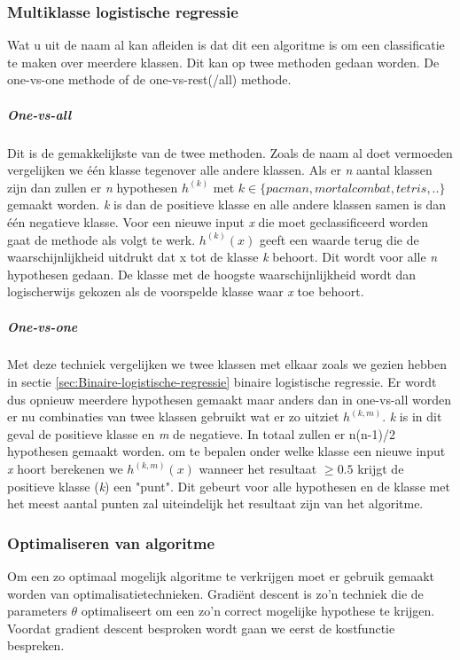 \subsubsection{Multiklasse logistische regressie}
\label{sec:Multiklasse-logistische-regressie}
Wat u uit de naam al kan afleiden is dat dit een algoritme is om een classificatie te maken over meerdere klassen. Dit kan op twee methoden gedaan worden. De one-vs-one methode of de one-vs-rest(/all) methode. 
\subparagraph{One-vs-all}
Dit is de gemakkelijkste van de twee methoden. Zoals de naam al doet vermoeden vergelijken we één klasse tegenover alle andere klassen. Als er \textit{n} aantal klassen zijn dan zullen er \textit{n} hypothesen $h^{(k)}$ met $k \in \{pacman, mortal combat, tetris, ..\}$ gemaakt worden. \textit{k} is dan de positieve klasse en alle andere klassen samen is dan één negatieve klasse. \newline
Voor een nieuwe input \textit{x} die moet geclassificeerd worden gaat de methode als volgt te werk. $h^{(k)} (x)$ geeft een waarde terug die de waarschijnlijkheid uitdrukt dat x tot de klasse \textit{k} behoort. Dit wordt voor alle \textit{n} hypothesen gedaan. De klasse met de hoogste waarschijnlijkheid wordt dan logischerwijs gekozen als de voorspelde klasse waar \textit{x} toe behoort. 
\subparagraph{One-vs-one}
Met deze techniek vergelijken we twee klassen met elkaar zoals we gezien hebben in sectie \ref{sec:Binaire-logistische-regressie} binaire logistische regressie. Er wordt dus opnieuw meerdere hypothesen gemaakt maar anders dan in one-vs-all worden er nu combinaties van twee klassen gebruikt wat er zo uitziet $h^{(k,m)}$. \textit{k} is in dit geval de positieve klasse en \textit{m} de negatieve. In totaal zullen er n(n-1)/2 hypothesen gemaakt worden.
om te bepalen onder welke klasse een nieuwe input \textit{x} hoort berekenen we $h^{(k,m)}(x)$ wanneer het resultaat $\geq 0.5$ krijgt de positieve klasse (\textit{k}) een "punt". Dit gebeurt voor alle hypothesen en de klasse met het meest aantal punten zal uiteindelijk het resultaat zijn van het algoritme. 

\subsubsection{Optimaliseren van algoritme}
\label{sec:Optimaliseren-algoritme}
Om een zo optimaal mogelijk algoritme te verkrijgen moet er gebruik gemaakt worden van optimalisatietechnieken. Gradiënt descent is zo'n techniek die de parameters $\theta$ optimaliseert om een zo'n correct mogelijke hypothese te krijgen. Voordat gradient descent besproken wordt gaan we eerst de kostfunctie bespreken. 

